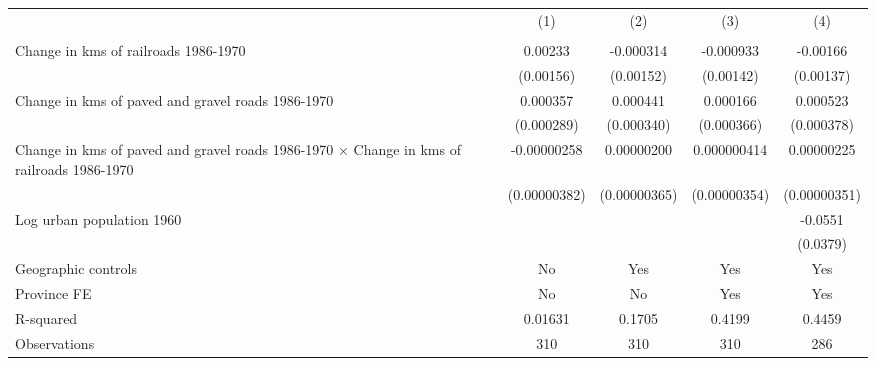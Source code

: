 {
\def\sym#1{\ifmmode^{#1}\else\(^{#1}\)\fi}
\begin{tabular}{l*{4}{c}}
\hline\hline
                &\multicolumn{1}{c}{(1)}&\multicolumn{1}{c}{(2)}&\multicolumn{1}{c}{(3)}&\multicolumn{1}{c}{(4)}\\
                &\multicolumn{1}{c}{}&\multicolumn{1}{c}{}&\multicolumn{1}{c}{}&\multicolumn{1}{c}{}\\
\hline
Change in kms of railroads 1986-1970&  0.00233         &-0.000314         &-0.000933         & -0.00166         \\
                &(0.00156)         &(0.00152)         &(0.00142)         &(0.00137)         \\
[1em]
Change in kms of paved and gravel roads 1986-1970& 0.000357         & 0.000441         & 0.000166         & 0.000523         \\
                &(0.000289)         &(0.000340)         &(0.000366)         &(0.000378)         \\
[1em]
Change in kms of paved and gravel roads 1986-1970 $\times$ Change in kms of railroads 1986-1970&-0.00000258         &0.00000200         &0.000000414         &0.00000225         \\
                &(0.00000382)         &(0.00000365)         &(0.00000354)         &(0.00000351)         \\
[1em]
Log urban population 1960&                  &                  &                  &  -0.0551         \\
                &                  &                  &                  & (0.0379)         \\
\hline
Geographic controls&       No         &      Yes         &      Yes         &      Yes         \\
Province FE     &       No         &       No         &      Yes         &      Yes         \\
R-squared       &  0.01631         &   0.1705         &   0.4199         &   0.4459         \\
Observations    &      310         &      310         &      310         &      286         \\
\hline\hline
\end{tabular}
}
